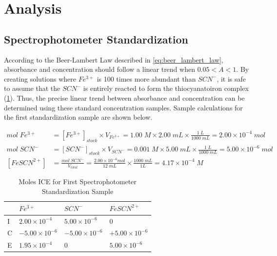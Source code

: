 \section{Analysis}
\subsection{Spectrophotometer Standardization}
\label{fig:spectrophotometer_standardization}
According to the Beer-Lambert Law described in \cref{eq:beer_lambert_law}, absorbance and concentration should follow a linear trend when \(0.05 < A < 1\). By creating solutions where \(Fe^{3+}\) is 100 times more abundant than \(SCN^-\), it is safe to assume that the \(SCN^-\) is entirely reacted to form the thiocyanatoiron complex (\cref{table:ice_standardization}). Thus, the precise linear trend between absorbance and concentration can be determined using these standard concentration samples. Sample calculations for the first standardization sample are shown below.

\begin{align}
    mol \; Fe^{3+} &= [Fe^{3+}]_{stock} \times V_{Fe^{3+}} = 1.00 \; M \times 2.00 \; mL \times \frac{1 \; L}{1000 \; mL} = 2.00 \times 10^{-4} \; mol \\
    mol \; SCN^- &= [SCN^-]_{stock} \times V_{SCN^-} = 0.001 \; M \times 5.00 \; mL \times \frac{1 \; L}{1000 \; mL} = 5.00 \times 10^{-6} \; mol \\
    [FeSCN^{2+}] &= \frac{mol \; SCN^-}{V_{total}} = \frac{2.00 \times 10^{-6} mol}{12 \; mL} \times \frac{1000 \; mL}{1 L} = 4.17 \times 10^{-4} \; M
\end{align}

\begin{table}[H]
\centering
\begin{tabular}{l|ll|l}
  & \(Fe^{3+}\) & \(SCN^-\) & \(FeSCN^{2+}\) \\ \hline
  
I & \(2.00 \times 10^{-4}\)                      & \(5.00 \times 10^{-6} \)
                      & 0                      \\ 
C & \(-5.00 \times 10^{-6} \)                     & \(-5.00 \times 10^{-6} \)                     & \(+5.00 \times 10^{-6}\)                      \\ 
E & \( 1.95 \times 10^{-4} \)                     & 0                      & \(5.00 \times 10^{-6} \)                \\ 
\end{tabular}
\caption{Moles ICE for First Spectrophotometer Standardization Sample}
\label{table:ice_standardization}
\end{table}

